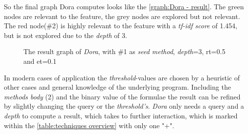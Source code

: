 So the final graph Dora computes looks like the \autoref{graph:Dora - result}. The green nodes are relevant to the feature, the grey nodes are explored but not relevant. The red node(\#2) is highly relevant to the feature with a \emph{tf-idf score} of 1.454, but is not explored due to the \textit{depth} of 3.
\begin{figure}[h]
	\centering
	\caption{The result graph of \textit{Dora}, with \#1 as \textit{seed method}, \textit{depth}=3, rt=0.5 and et=0.1}
	\label{graph:Dora - result}
\end{figure}
 In modern cases of application the \textit{threshold}-values are chosen by a heuristic of other cases and general knowledge of the underlying program. Including the \textit{methods body} (2) and the binary value of the formulae the result can be refined by slightly changing the query or the \textit{threshold's}. \newline
\emph{Dora} only needs a query and a \textit{depth} to compute a result, which takes to further interaction, which is marked within the \autoref{table:techniques overview} with only one "+".

